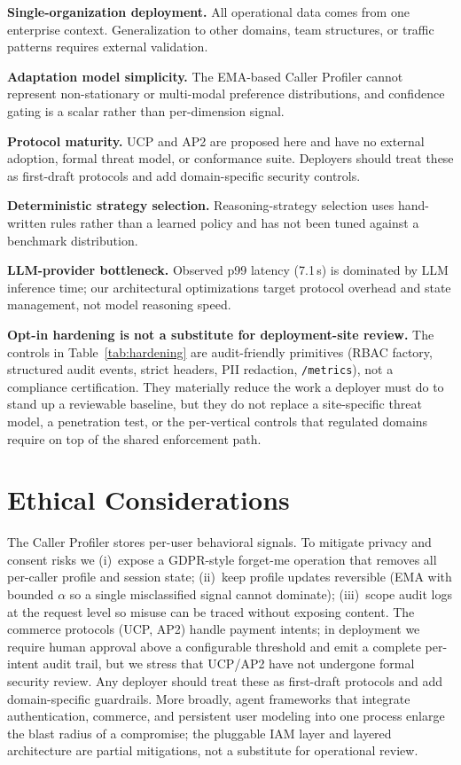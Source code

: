 \documentclass[11pt]{article}
\begin{document}
\textbf{Single-organization deployment.} All operational data comes from one enterprise context. Generalization to other domains, team structures, or traffic patterns requires external validation.

\textbf{Adaptation model simplicity.} The EMA-based Caller Profiler cannot represent non-stationary or multi-modal preference distributions, and confidence gating is a scalar rather than per-dimension signal.

\textbf{Protocol maturity.} UCP and AP2 are proposed here and have no external adoption, formal threat model, or conformance suite. Deployers should treat these as first-draft protocols and add domain-specific security controls.

\textbf{Deterministic strategy selection.} Reasoning-strategy selection uses hand-written rules rather than a learned policy and has not been tuned against a benchmark distribution.

\textbf{LLM-provider bottleneck.} Observed p99 latency (7.1\,s) is dominated by LLM inference time; our architectural optimizations target protocol overhead and state management, not model reasoning speed.

\textbf{Opt-in hardening is not a substitute for deployment-site review.} The controls in Table~\ref{tab:hardening} are audit-friendly primitives (RBAC factory, structured audit events, strict headers, PII redaction, \texttt{/metrics}), not a compliance certification. They materially reduce the work a deployer must do to stand up a reviewable baseline, but they do not replace a site-specific threat model, a penetration test, or the per-vertical controls that regulated domains require on top of the shared enforcement path.

\section*{Ethical Considerations}

The Caller Profiler stores per-user behavioral signals. To mitigate privacy and consent risks we (i)~expose a GDPR-style forget-me operation that removes all per-caller profile and session state; (ii)~keep profile updates reversible (EMA with bounded $\alpha$ so a single misclassified signal cannot dominate); (iii)~scope audit logs at the request level so misuse can be traced without exposing content. The commerce protocols (UCP, AP2) handle payment intents; in deployment we require human approval above a configurable threshold and emit a complete per-intent audit trail, but we stress that UCP/AP2 have not undergone formal security review. Any deployer should treat these as first-draft protocols and add domain-specific guardrails. More broadly, agent frameworks that integrate authentication, commerce, and persistent user modeling into one process enlarge the blast radius of a compromise; the pluggable IAM layer and layered architecture are partial mitigations, not a substitute for operational review.


\end{document}
